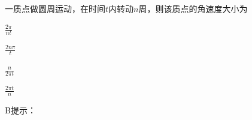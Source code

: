 一质点做圆周运动，在时间\(t\)内转动\(n\)周，则该质点的角速度大小为\paren[]
\begin{choices}
	\item \(\frac{2\pi}{nt}\)
	\item \(\frac{2n\pi}{t}\)
	\item \(\frac{n}{2\pi t}\)
	\item \(\frac{2\pi t}{n}\)
\end{choices}
\begin{answer}
	B\qquad 提示：
\end{answer}